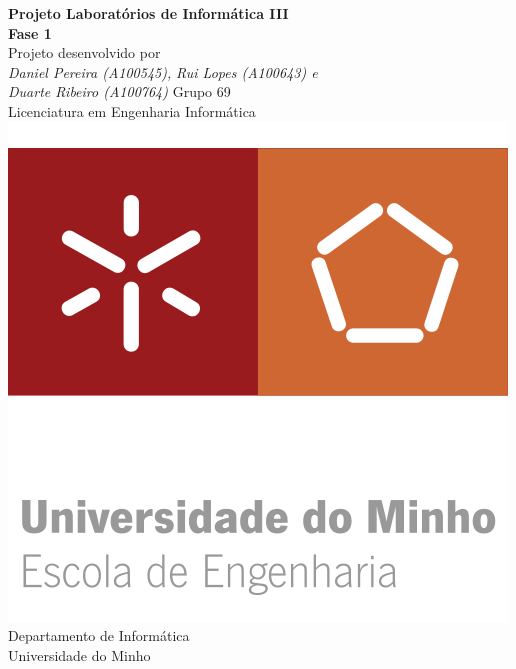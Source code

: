 \documentclass[12pt,a4paper]{report}
\begin{document}
\begin{titlepage}
    {\centering
        {
        \LARGE{\textbf{Projeto Laboratórios de Informática III\\Fase 1}} \\ 
        \vspace*{\fill} 
        {\large{Projeto desenvolvido por}} \\
        \vspace 
        {\Large{\itshape Daniel Pereira (A100545), }{\itshape Rui Lopes (A100643) e \\ }{\itshape Duarte Ribeiro (A100764)}}
        {\small{Grupo 69}}
        \vspace*{\fill} \\
        {\Large Licenciatura em Engenharia Informática} \\
        \vspace*{\fill}
        \includegraphics[scale=1.25]{assets/eeng.png} \\ [0.5cm]
        {\large Departamento de Informática \\ Universidade do Minho} \\
        }
    }
\end{titlepage}

\newpage

    \tableofcontents

\newpage
\end{document}
